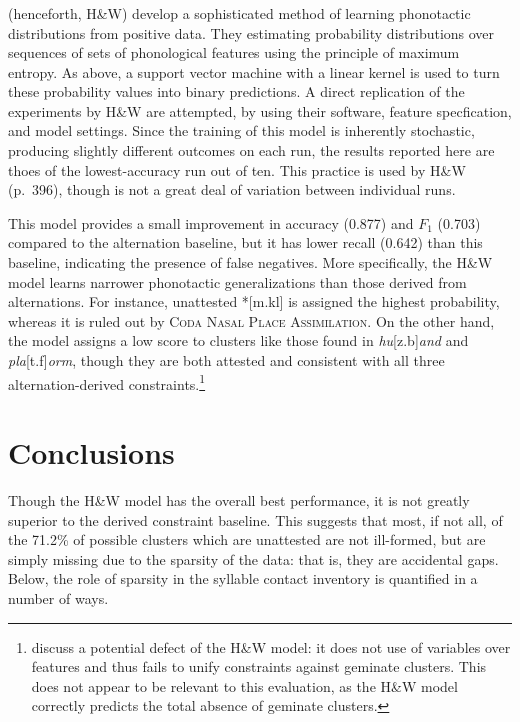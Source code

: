
\subsubsection{\citet{Hayes2008a}}

\citet{Hayes2008a} (henceforth, H\&W) develop a sophisticated method of learning phonotactic distributions from positive data. They estimating probability distributions over sequences of sets of phonological features using the principle of maximum entropy. As above, a support vector machine with a linear kernel is used to turn these probability values into binary predictions. A direct replication of the experiments by H\&W are attempted, by using their software, feature specfication, and model settings. Since the training of this model is inherently stochastic, producing slightly different outcomes on each run, the results reported here are thoes of the lowest-accuracy run out of ten. This practice is used by H\&W (p.~396), though is not a great deal of variation between individual runs.

This model provides a small improvement in accuracy (0.877) and $F_1$ (0.703) compared to the alternation baseline, but it has lower recall (0.642) than this baseline, indicating the presence of false negatives. More specifically, the H\&W model learns narrower phonotactic generalizations than those derived from alternations. For instance, unattested *[m.kl] is assigned the highest probability, whereas it is ruled out by \textsc{Coda Nasal Place Assimilation}. On the other hand, the \citeauthor{Hayes2008a} model assigns a low score to clusters like those found in \emph{hu}[z.b]\emph{and} and \emph{pla}[t.f]\emph{orm}, though they are both attested and consistent with all three alternation-derived constraints.\footnote{\citet{Berent2012} discuss a potential defect of the H\&W model: it does not use of variables over features and thus fails to unify constraints against geminate clusters. This does not appear to be relevant to this evaluation, as the H\&W model correctly predicts the total absence of geminate clusters.}

\section{Conclusions}

Though the H\&W model has the overall best performance, it is not greatly superior to the derived constraint baseline. This suggests that most, if not all, of the 71.2\% of possible clusters which are unattested are not ill-formed, but are simply missing due to the sparsity of the data: that is, they are accidental gaps. Below, the role of sparsity in the syllable contact inventory is quantified in a number of ways. 


